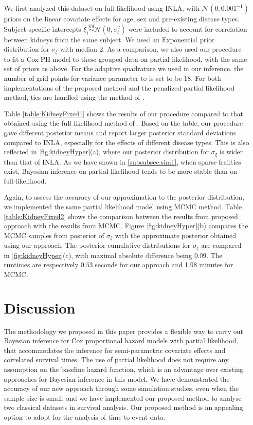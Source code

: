 \documentclass[ba]{imsart}
\begin{document}
We first analyzed this dataset on full-likelihood using INLA, with $\mathcal{N}(0, 0.001^{-1})$ priors on the linear covariate effects for age, sex and pre-existing disease types. Subject-specific intercepts $\xi_{i}\overset{iid}{\sim}\mathcal{N}(0,\sigma^{2}_{\xi})$ were included to account for correlation between kidneys from the same subject. We used an $\text{Exponential}$ prior distribution for $\sigma_{\xi}$ with median 2. As a comparison, we also used our procedure to fit a Cox PH model to these grouped data on partial likelihood, with the same set of priors as above. For the adaptive quadrature we used in our inference, the number of grid points for variance parameter to is set to be 18. For both implementations of the proposed method and the penalized partial likelihood method, ties are handled using the method of \cite{Breslow}.

Table \ref{table:KidneyFixed1} shows the results of our procedure compared to that obtained using the full likelihood method of \cite{inlacoxph}. Based on the table, our procedure gave different posterior means and report larger posterior standard deviations compared to INLA, especially for the effects of different disease types. This is also reflected in \ref{fig:kidneyHyper}(a), where our posterior distribution for $\sigma_{\xi}$ is wider than that of INLA. As we have shown in \ref{subsubsec:sim1}, when sparse frailties exist, Bayesian inference on partial likelihood tends to be more stable than on full-likelihood.

Again, to assess the accuracy of our approximation to the posterior distribution, we implemented the same partial likelihood model using MCMC method. Table \ref{table:KidneyFixed2} shows the comparison between the results from proposed approach with the results from MCMC. Figure \ref{fig:kidneyHyper}(b) compares the MCMC samples from posterior of $\sigma_{\xi}$ with the approximate posterior obtained using our approach. The posterior cumulative distributions for $\sigma_{\xi}$ are compared in \ref{fig:kidneyHyper}(c), with maximal absolute difference being 0.09. The runtimes are respectively 0.53 seconds for our approach and 1.98 minutes for MCMC.

\section{Discussion}\label{sec:discussion}

The methodology we proposed in this paper provides a flexible way to carry out Bayesian inference for Cox proportional hazard models with partial likelihood, that accommodates the inference for semi-parametric covariate effects and correlated survival times. The use of partial likelihood does not require any assumption on the baseline hazard function, which is an advantage over existing approaches for Bayesian inference in this model. We have demonstrated the accuracy of our new approach through some simulation studies, even when the sample size is small, and we have implemented our proposed method to analyse two classical datasets in survival analysis. Our proposed method is an appealing option to adopt for the analysis of time-to-event data.
\end{document}

